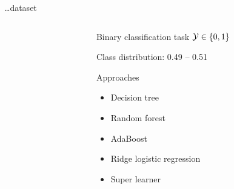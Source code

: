 

\begin{frame}{\dots dataset}

\begin{columns}[T]
\begin{column}{0.5\textwidth}

\end{column}
\begin{column}{0.5\textwidth}
Binary classification task $\mathcal{Y}\in\{0,1\}$%

Class distribution: 0.49 -- 0.51

Approaches
\begin{itemize}
	\item Decision tree
	\item Random forest
	\item AdaBoost
	\item Ridge logistic regression
	\item Super learner
\end{itemize}
\end{column}
\end{columns}

\end{frame}


